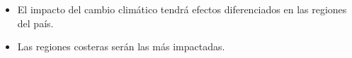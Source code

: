     \begin{tcolorbox}[enhanced, colback=mycolor,colframe=mycolor,drop fuzzy shadow,watermark color=white,
                        title=Principales Resultados]
    
            \begin{itemize}
                    \item El impacto del cambio climático tendrá efectos diferenciados en las regiones del país.
                    \item Las regiones costeras serán las más impactadas.
            \end{itemize}
     
    \end{tcolorbox}
